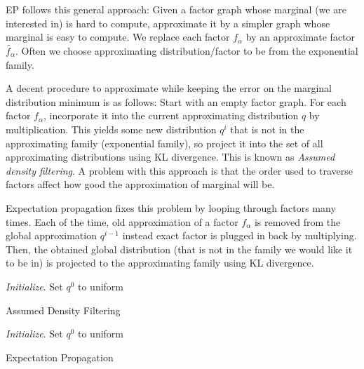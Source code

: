 \documentclass[12pt]{article}
\begin{document}
EP follows this general approach: Given a factor graph whose marginal (we are interested in) is hard to compute, approximate it by a simpler graph whose marginal is easy to compute. We replace each factor $f_\alpha$ by an approximate factor $\tilde{f_\alpha}$. Often we choose approximating distribution/factor to be from the exponential family. 

A decent procedure to approximate while keeping the error on the marginal distribution minimum is as follows: Start with an empty factor graph. For each factor $f_\alpha$, incorporate it into the current approximating distribution $q$ by multiplication. This yields some new distribution $q^i$ that is not in the approximating family (exponential family), so project it into the set of all approximating distributions using KL divergence. This is known as \textit{Assumed density filtering}. A problem with this approach is that the order used to traverse factors affect how good the approximation of marginal will be.

Expectation propagation fixes this problem by looping through factors many times. Each of the time, old approximation of a factor $f_\alpha$ is removed from the global approximation $q^{i-1}$ instead exact factor is plugged in back by multiplying. Then, the obtained global distribution (that is not in the family we would like it to be in) is projected to the approximating family using KL divergence.

\begin{algorithm}[H]
	\textit{Initialize}. Set $q^0$ to uniform
	\caption{Assumed Density Filtering}
	\label{adf}
\end{algorithm} \vspace{5mm}

\begin{algorithm}[H]
	\textit{Initialize}. Set $q^0$ to uniform \\
	\caption{Expectation Propagation}
	\label{ep}
\end{algorithm}
\clearpage
\end{document}
